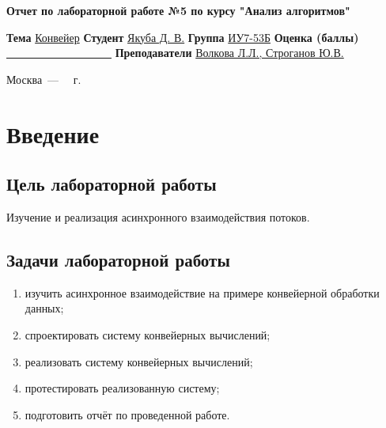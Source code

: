 \documentclass[12pt]{report}
\begin{document}
\begin{titlepage}
	
	\begin{center}
		\Large\textbf{Отчет по лабораторной работе №5 по курсу "Анализ алгоритмов"}\newline
	\end{center}
	
	\noindent\textbf{Тема} \underline{Конвейер}\newline\newline\newline
	\noindent\textbf{Студент} \underline{Якуба Д. В.}\newline\newline
	\noindent\textbf{Группа} \underline{ИУ7-53Б}\newline\newline
	\noindent\textbf{Оценка (баллы)} \underline{~~~~~~~~~~~~~~~~~~~}\newline\newline
	\noindent\textbf{Преподаватели} \underline{Волкова Л.Л., Строганов Ю.В.}\newline
	
	\begin{center}
		\vfill
		Москва~---~\the\year
		~г.
	\end{center}
\end{titlepage}

\setcounter{page}{2}

\tableofcontents

\newpage
\chapter*{Введение}
\section*{Цель лабораторной работы}
Изучение и реализация асинхронного взаимодействия потоков.
\section*{Задачи лабораторной работы}
\begin{enumerate}
\item изучить асинхронное взаимодействие на примере конвейерной обработки данных;
\item спроектировать систему конвейерных вычислений;
\item реализовать систему конвейерных вычислений;
\item протестировать реализованную систему;
\item подготовить отчёт по проведенной работе.
\end{enumerate}
\end{document}
